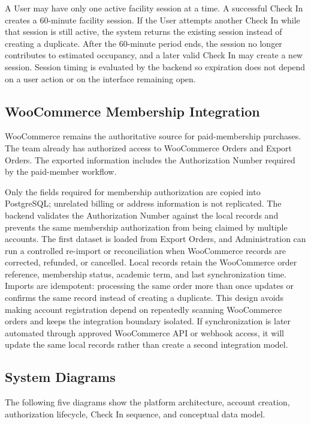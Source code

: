 \documentclass[11pt,letterpaper]{article}
\begin{document}
A User may have only one active facility session at a time. A successful Check In creates a 60-minute facility session. If the User attempts another Check In while that session is still active, the system returns the existing session instead of creating a duplicate. After the 60-minute period ends, the session no longer contributes to estimated occupancy, and a later valid Check In may create a new session. Session timing is evaluated by the backend so expiration does not depend on a user action or on the interface remaining open.

\subsection{WooCommerce Membership Integration}

WooCommerce remains the authoritative source for paid-membership purchases. The team already has authorized access to WooCommerce Orders and Export Orders. The exported information includes the Authorization Number required by the paid-member workflow.

Only the fields required for membership authorization are copied into PostgreSQL; unrelated billing or address information is not replicated. The backend validates the Authorization Number against the local records and prevents the same membership authorization from being claimed by multiple accounts. The first dataset is loaded from Export Orders, and Administration can run a controlled re-import or reconciliation when WooCommerce records are corrected, refunded, or cancelled. Local records retain the WooCommerce order reference, membership status, academic term, and last synchronization time. Imports are idempotent: processing the same order more than once updates or confirms the same record instead of creating a duplicate. This design avoids making account registration depend on repeatedly scanning WooCommerce orders and keeps the integration boundary isolated. If synchronization is later automated through approved WooCommerce API or webhook access, it will update the same local records rather than create a second integration model.



\subsection{System Diagrams}

The following five diagrams show the platform architecture, account creation, authorization lifecycle, Check In sequence, and conceptual data model.
\end{document}
